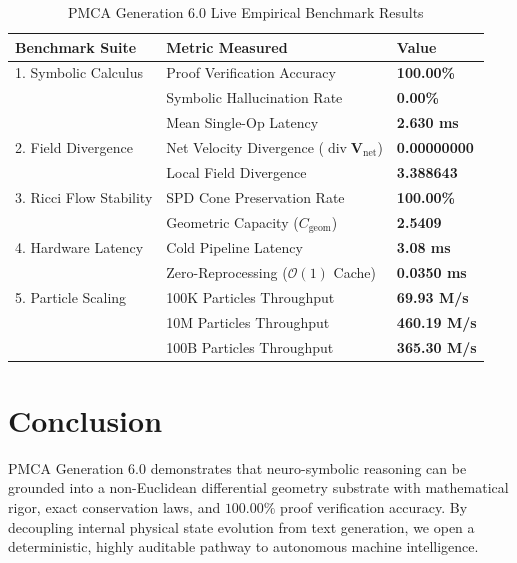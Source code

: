 \documentclass[12pt, a4paper]{article}
\begin{document}
\begin{table}[h]
\caption{PMCA Generation 6.0 Live Empirical Benchmark Results}
\label{tab:benchmarks}
\centering
\begin{tabular}{lll}
\toprule
\textbf{Benchmark Suite} & \textbf{Metric Measured} & \textbf{Value} \\
\midrule
1. Symbolic Calculus & Proof Verification Accuracy & \textbf{100.00\%} \\
   & Symbolic Hallucination Rate & \textbf{0.00\%} \\
   & Mean Single-Op Latency & \textbf{2.630 ms} \\
\midrule
2. Field Divergence & Net Velocity Divergence ($\operatorname{div}\mathbf{V}_{\text{net}}$) & \textbf{0.00000000} \\
   & Local Field Divergence & \textbf{3.388643} \\
\midrule
3. Ricci Flow Stability & SPD Cone Preservation Rate & \textbf{100.00\%} \\
   & Geometric Capacity ($C_{\text{geom}}$) & \textbf{2.5409} \\
\midrule
4. Hardware Latency & Cold Pipeline Latency & \textbf{3.08 ms} \\
   & Zero-Reprocessing ($\mathcal{O}(1)$ Cache) & \textbf{0.0350 ms} \\
\midrule
5. Particle Scaling & 100K Particles Throughput & \textbf{69.93 M/s} \\
   & 10M Particles Throughput & \textbf{460.19 M/s} \\
   & 100B Particles Throughput & \textbf{365.30 M/s} \\
\bottomrule
\end{tabular}
\end{table}

\section{Conclusion}
PMCA Generation 6.0 demonstrates that neuro-symbolic reasoning can be grounded into a non-Euclidean differential geometry substrate with mathematical rigor, exact conservation laws, and $100.00\%$ proof verification accuracy. By decoupling internal physical state evolution from text generation, we open a deterministic, highly auditable pathway to autonomous machine intelligence.
\end{document}
